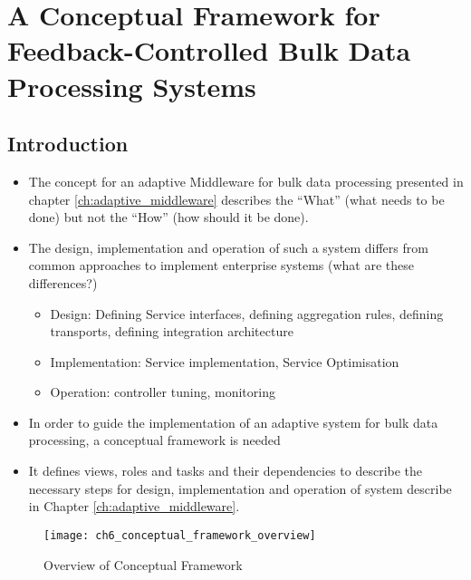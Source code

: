 

\chapter[Conceptual Framework]{A Conceptual Framework for Feedback-Controlled Bulk Data Processing Systems}\label{ch:conceptual_framework}


\section{Introduction} 

\begin{itemize}
	\item The concept for an adaptive Middleware for bulk data processing presented in chapter \ref{ch:adaptive_middleware} describes the ``What'' (what needs to be done) but not the ``How'' (how should it be done).
	\item The design, implementation and operation of such a system differs from common approaches to implement enterprise systems (what are these differences?)
	\begin{itemize}
		\item Design: Defining Service interfaces, defining aggregation rules, defining transports, defining integration architecture
		\item Implementation: Service implementation, Service Optimisation
		\item Operation: controller tuning, monitoring
	\end{itemize}
	\item In order to guide the implementation of an adaptive system for bulk data processing, a conceptual framework is needed
	\item It defines views, roles and tasks and their dependencies to describe the necessary steps for design, implementation and operation of system describe in Chapter \ref{ch:adaptive_middleware}.
\end{itemize}

\begin{figure}
	[htpb] \centering 
	\texttt{[image: ch6\_conceptual\_framework\_overview]} \caption{Overview of Conceptual Framework} \label{fig:ch6_conceptional_framework_overview} 
\end{figure}

